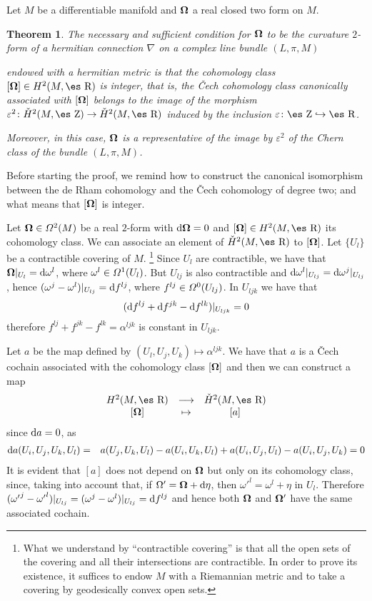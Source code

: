 \documentclass[12pt]{article}
\newtheorem{teor}{Theorem}
\def\beann{\begin{eqnarray*}}
\def\eeann{\end{eqnarray*}}
\def\d{{\rm d}}
\def\curv{{\bf \Omega}}
\def\Zahl{\mbox{\es Z}}
\def\Real{\mbox{\es R}}
\begin{document}
Let $M$ be a differentiable manifold and $\curv $ a real closed two form
on $M$.

\begin{teor}
The necessary and sufficient condition for $\curv $ to be the curvature
$2$-form
of a hermitian connection $\nabla$ on a complex line bundle $(L,\pi ,M)$

endowed with a hermitian metric is that the cohomology class
$[\curv ] \in H^2(M,\Real )$ is integer, that is, the \v{C}ech
cohomology class
canonically associated with $[\curv ]$ belongs to the image of the
morphism
$\varepsilon^2 \colon \check{H}^2(M,\Zahl ) \to \check{H}^2(M,\Real )$
induced by the inclusion $\varepsilon \colon \Zahl \hookrightarrow
\Real$.

Moreover, in this case, $\curv $ is a representative of the image by
$\varepsilon^2$
of the Chern class of the bundle $(L,\pi ,M)$.
\label{cce}
\end{teor}

Before starting the proof, we remind how to construct
the canonical isomorphism between the
de Rham cohomology and the \v{C}ech cohomology
of degree two; and what means that $[\curv ]$ is integer.

Let $\curv  \in {\mit\Omega}^2(M)$ be
a real $2$-form with $\d\curv  = 0$ and
$[\curv ] \in H^2(M,\Real )$ its cohomology class.
We can associate an element of $\check{H}^2(M,\Real )$ to $[\curv ]$.
Let $\{ U_l \}$ be a contractible covering of $M$.%
\footnote
{What we understand by ``contractible covering'' is that
all the open sets of the covering
and all their intersections are contractible.
In order to prove its existence, it suffices to endow $M$ with a
Riemannian metric and to take a
covering by geodesically convex open sets.}
Since $U_l$ are contractible, we have that
$\curv  \vert_{U_l} = \d \omega^l $,
where $\omega^l  \in {\mit\Omega}^1(U_l)$.
But $U_{l j}$ is also contractible and
$\d\omega^l  \vert_{U_{l j}} = \d\omega^j \vert_{U_{l j}}$,
hence $(\omega^j - \omega^l )\vert_{U_{l j}} = \d f^{l j}$,
where $f^{l j} \in {\mit\Omega}^0(U_{l j})$. In $U_{l jk}$ we have that
$$
(\d f^{l j} + \d f^{jk} - \d f^{l k})\vert_{U_{l jk}} =0
$$
therefore $f^{l j} + f^{jk} - f^{l k} = \alpha^{l jk}$ is constant in
$U_{l jk}$.

Let $a$ be the map defined by
$(U_l,U_j,U_k) \mapsto \alpha^{l jk}$.
We have that $a$ is a \v{C}ech cochain associated with the
cohomology class $[\curv ]$ and then we can construct a map
$$
\begin{array}{ccc}
H^2(M,\Real ) & \longrightarrow & \check{H}^2(M,\Real )
\nopagebreak
\\ {}
[\curv ] & \mapsto & [a]
\end{array}
$$
since $\d a = 0$, as
\beann
\d a (U_i,U_j,U_k,U_l)
&=&
a(U_j,U_k,U_l) - a(U_i,U_k,U_l) + a(U_i,U_j,U_l) - a(U_i,U_j,U_k) = 0
\eeann
It is evident that $[a]$ does not depend
on $\curv $ but only on its cohomology class,
since, taking into account that, if $\Omega' = \curv  + \d \eta$,
then ${\omega'}^l = \omega^l  + \eta$ in $U_l$. Therefore
$({\omega'}^j - {\omega'}^l)\vert_{U_{l j}} =
(\omega^j - \omega^l )\vert_{U_{l j}} = \d f^{l j}$
and hence both $\curv $ and ${\bf \Omega'}$
have the same associated cochain.
\end{document}
